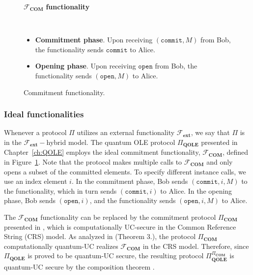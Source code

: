 \begin{figure}[]
\centering
\begin{tcolorbox}
                        
    \centerline{$\mathcal{F}_{\textbf{COM}}$ \textbf{functionality}}
            
    \
    
    \begin{itemize}
        \item \textbf{Commitment phase}. Upon receiving $( \texttt{commit}, M)$ from Bob, the functionality sends $\texttt{commit}$ to Alice. 
        \item \textbf{Opening phase}. Upon receiving $\texttt{open}$ from Bob, the functionality sends $(\texttt{open}, M)$ to Alice. 
    \end{itemize}
    
\end{tcolorbox} 
    \caption{Commitment functionality.}
    \label{fig:func_com}
\end{figure}


\subsubsection{Ideal functionalities}\label{functinalities}

Whenever a protocol $\Pi$ utilizes an external functionality $\mathcal{F}_{\textbf{ext}}$, we say that $\Pi$ is in the $\mathcal{F}_{\textbf{ext}}-$hybrid model. The quantum OLE protocol $\Pi_{\textbf{QOLE}}$ presented in Chapter~\ref{ch:QOLE} employs the ideal commitment functionality, $\mathcal{F}_{\textbf{COM}}$, defined in Figure~\ref{fig:func_com}. Note that the protocol makes multiple calls to $\mathcal{F}_{\textbf{COM}}$ and only opens a subset of the committed elements. To specify different instance calls, we use an index element $i$. In the commitment phase, Bob sends $(\texttt{commit}, i, M)$ to the functionality, which in turn sends $(\texttt{commit}, i)$ to Alice. In the opening phase, Bob sends $(\texttt{open}, i)$, and the functionality sends $(\texttt{open}, i, M)$ to Alice.

The $\mathcal{F}_{\textbf{COM}}$ functionality can be replaced by the commitment protocol $\Pi_{\textbf{COM}}$ presented in \cite{CF01}, which is computationally UC-secure in the Common Reference String (CRS) model. As analyzed in \cite{CBGLM21} (Theorem 3.), the protocol $\Pi_{\textbf{COM}}$ computationally quantum-UC realizes $\mathcal{F}_{\textbf{COM}}$ in the CRS model. Therefore, since $\Pi_{\textbf{QOLE}}$ is proved to be quantum-UC secure, the resulting protocol $\Pi_{\textbf{QOLE}}^{\Pi_{\textbf{COM}}}$ is quantum-UC secure by the composition theorem \citep{Unruh10}.


